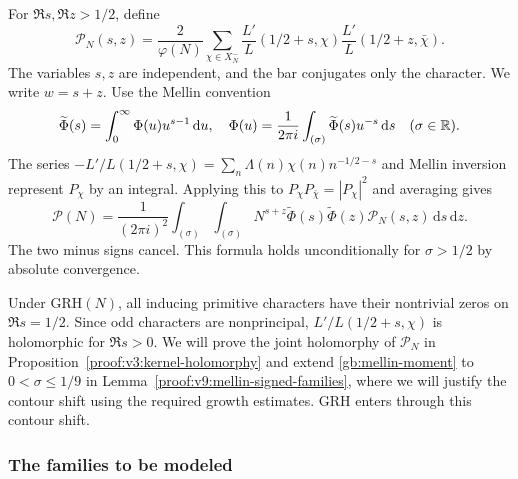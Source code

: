 \documentclass[12pt,a4paper]{amsart}
\numberwithin{equation}{section}
\def\d{\,{\rm d}}
\def\le{\leqslant}
\theoremstyle{plain}
\theoremstyle{definition}
\theoremstyle{remark}
\begin{document}
For $\Re s,\Re z>1/2$, define
\begin{equation}\label{eq:goldbach-moment}
 \mathscr P_N(s,z)=\frac2{\varphi(N)}\sum_{\chi\in X_N^-}
       \frac{L'}L(1/2+s,\chi)
       \frac{L'}L(1/2+z,\bar\chi).
\end{equation}
The variables $s,z$ are independent, and the bar conjugates only
the character. We write $w=s+z$. Use the Mellin convention
\begin{equation}\label{gb:mellin-convention}
 \widetilde{\Phi}(s)=\int_0^\infty \Phi(u)u^{s-1}\d u,
 \quad
 \Phi(u)=\frac1{2\pi i}\int_{(\sigma)}\widetilde{\Phi}(s)u^{-s}\d s
 \quad(\sigma\in\mathbb R).
\end{equation}
The series $-L'/L(1/2+s,\chi)=\sum_n\Lambda(n)\chi(n)n^{-1/2-s}$
and Mellin inversion represent $P_\chi$ by an integral. Applying
this to $P_\chi P_{\bar\chi}=|P_\chi|^2$ and averaging gives
\begin{equation}\label{gb:mellin-moment}
 \mathcal P(N)=\frac1{(2\pi i)^2}
 \int_{(\sigma)}\int_{(\sigma)}
 N^{s+z}\widetilde{\Phi}(s)\widetilde{\Phi}(z)\mathscr P_N(s,z)
          \,\mathrm ds\,\mathrm dz.
\end{equation}
The two minus signs cancel. This formula holds
unconditionally for $\sigma>1/2$ by absolute convergence.

Under $\mathrm{GRH}(N)$, all inducing primitive characters have
their nontrivial zeros on $\Re s=1/2$. Since odd characters are
nonprincipal, $L'/L(1/2+s,\chi)$ is holomorphic for $\Re s>0$.
We will prove the joint holomorphy of $\mathscr P_N$ in
Proposition~\ref{proof:v3:kernel-holomorphy} and extend
\eqref{gb:mellin-moment} to $0<\sigma\le1/9$ in
Lemma~\ref{proof:v9:mellin-signed-families}, where we will justify
the contour shift using the required growth estimates.
GRH enters through this contour shift.

\subsubsection{The families to be modeled}
\label{story:dirichlet-families}
\end{document}
